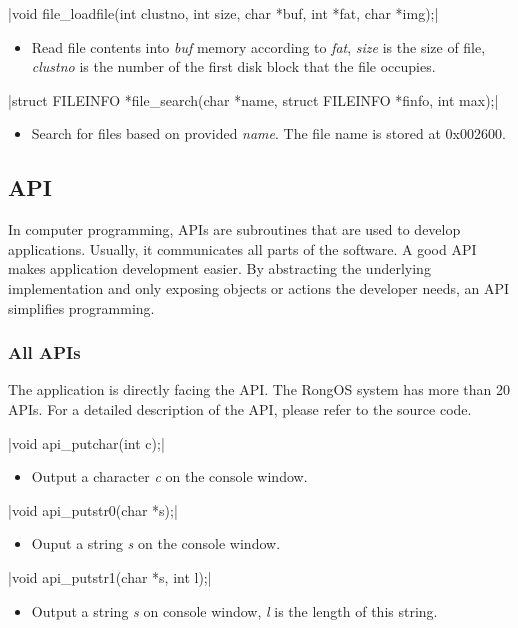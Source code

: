 \documentclass{swfcthesis}
\begin{document}
\csingle|void file_loadfile(int clustno, int size, char *buf, int *fat, char *img);|
\begin{itemize}
\item Read file contents into \emph{buf} memory according to \emph{fat}, \emph{size} is
  the size of file, \emph{clustno} is the number of the first disk block that the file
  occupies.
    
\end{itemize}

\csingle|struct FILEINFO *file_search(char *name, struct FILEINFO *finfo, int max);|
\begin{itemize}
\item Search for files based on provided \emph{name}. The file name is stored at 0x002600.
\end{itemize}

\subsection{API}
\label{sec:api}
In computer programming, APIs are subroutines that are used to develop
applications. Usually, it communicates all parts of the software. A good API makes
application development easier. By abstracting the underlying implementation and only
exposing objects or actions the developer needs, an API simplifies programming.

\subsubsection{All APIs}
\label{sec:all-apis}
The application is directly facing the API. The RongOS system has more than 20 APIs.
For a detailed description of the API, please refer to the source code.



\csingle|void api_putchar(int c);|
\begin{itemize}
\item Output a character \emph{c} on the console window.
\end{itemize}

\csingle|void api_putstr0(char *s);|
\begin{itemize}
\item Ouput a string \emph{s} on the console window.
\end{itemize}

\csingle|void api_putstr1(char *s, int l);|
\begin{itemize}
\item Output a string \emph{s} on console window, \emph{l} is the length of this string.
\end{itemize}
\end{document}
